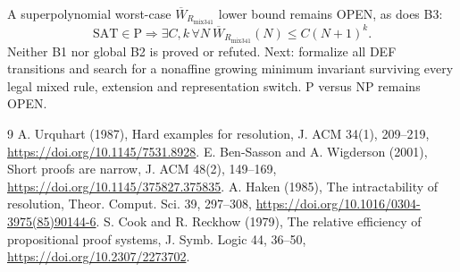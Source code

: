 \documentclass[11pt]{article}
\begin{document}
A superpolynomial worst-case $\overline W_{R_{\mathrm{mix341}}}$ lower bound remains OPEN, as does B3:
\[
 \mathrm{SAT}\in\mathrm P\Longrightarrow\exists C,k\,\forall N\
 \overline W_{R_{\mathrm{mix341}}}(N)\le C(N+1)^k.
\]
Neither B1 nor global B2 is proved or refuted. Next: formalize all DEF transitions and search for a nonaffine growing minimum invariant surviving every legal mixed rule, extension and representation switch. P versus NP remains OPEN.

\begin{thebibliography}{9}
 A. Urquhart (1987), Hard examples for resolution, J. ACM 34(1), 209--219, \url{https://doi.org/10.1145/7531.8928}.
\bibitem{bw} E. Ben-Sasson and A. Wigderson (2001), Short proofs are narrow, J. ACM 48(2), 149--169, \url{https://doi.org/10.1145/375827.375835}.
\bibitem{h} A. Haken (1985), The intractability of resolution, Theor. Comput. Sci. 39, 297--308, \url{https://doi.org/10.1016/0304-3975(85)90144-6}.
\bibitem{cr} S. Cook and R. Reckhow (1979), The relative efficiency of propositional proof systems, J. Symb. Logic 44, 36--50, \url{https://doi.org/10.2307/2273702}.
\end{thebibliography}
\end{document}
